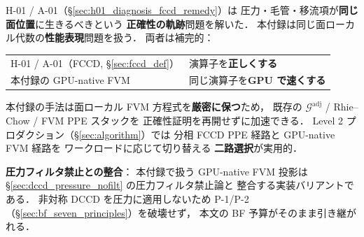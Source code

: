 H-01 / A-01（\S\ref{sec:h01_diagnosis_fccd_remedy}）は
圧力・毛管・移流項が\textbf{同じ面位置}に生きるべきという
\textbf{正確性の軌跡}問題を解いた．
本付録は同じ面ローカル代数の\textbf{性能表現}問題を扱う．
両者は補完的：
\begin{center}
\begin{tabular}{@{}ll@{}}
\hline
H-01 / A-01（FCCD, \S\ref{sec:fccd_def}）& 演算子を\textbf{正しくする} \\
本付録の GPU-native FVM & 同じ演算子を\textbf{GPU で速くする} \\
\hline
\end{tabular}
\end{center}
本付録の手法は面ローカル FVM 方程式を\textbf{厳密に保つ}ため，
既存の $\mathcal{G}^\text{adj}$ / Rhie--Chow / FVM PPE スタックを
正確性証明を再開せずに加速できる．
Level 2 プロダクション（\S\ref{sec:algorithm}）では
分相 FCCD PPE 経路と GPU-native FVM 経路を
ワークロードに応じて切り替える
\textbf{二路選択}が実用的．

\noindent\textbf{圧力フィルタ禁止との整合}：
本付録で扱う GPU-native FVM 投影は
\S\ref{sec:dccd_pressure_nofilt} の圧力フィルタ禁止論と
整合する実装バリアントである．
非対称 DCCD を圧力に適用しないため P-1/P-2
（\S\ref{sec:bf_seven_principles}）を破壊せず，
本文の BF 予算がそのまま引き継がれる．

